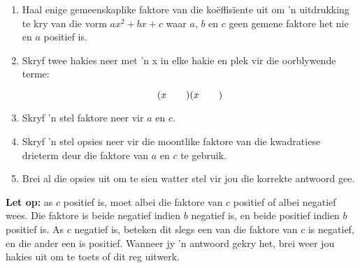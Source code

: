 \begin{enumerate}[itemsep=5pt, label=\textbf{\arabic*}. ] 
\item Haal enige gemeenskaplike faktore van die koëffisïente uit om ’n uitdrukking te kry van die vorm $a{x}^{2}+bx+c$ waar $a$, $b$ en $c$ geen gemene faktore het nie en $a$ positief is.
\item Skryf twee hakies neer met ’n x in elke hakie en plek vir die oorblywende terme:

\begin{equation*}
(x\phantom{\rule{2.em}{0ex}})(x\phantom{\rule{2.em}{0ex}})
\end{equation*}
\item Skryf ’n stel faktore neer vir $a$ en $c$.
\item Skryf ’n stel opsies neer vir die moontlike faktore van die kwadratiese drieterm deur die faktore van $a$ en $c$ te gebruik.
\item Brei al die opsies uit om te sien watter stel vir jou die korrekte antwoord gee.
\end{enumerate}
 \textbf{Let op:} as $c$ positief is, moet albei die faktore van $c$ positief of albei negatief wees. Die faktore is beide negatief indien $b$ negatief is, en beide positief indien $b$ positief is. As $c$ negatief is, beteken dit slegs een van die faktore van $c$ is negatief, en die ander een is positief. Wanneer jy ’n antwoord gekry het, brei weer jou hakies uit om te toets of dit reg uitwerk.
